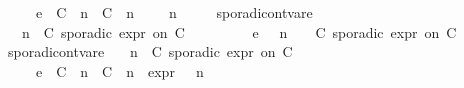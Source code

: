 \begin{isabellebody}
\ \ \ \ \ {\isasymhookrightarrow}\isactrlsub e\ \ {\isacharparenleft}{\isacharparenleft}{\isacharparenleft}C\ {\isasymUp}\ n{\isacharparenright}\ {\isacharhash}\ {\isacharparenleft}C\ {\isasymDown}\ n\ {\isacharat}\ {\isasymtau}{\isacharparenright}\ {\isacharhash}\ {\isasymGamma}{\isacharparenright}{\isacharcomma}\ n\ {\isasymturnstile}\ {\isasymPsi}\ {\isasymtriangleright}\ {\isasymPhi}{\isacharparenright}{\isacartoucheclose}\isanewline
{\isacharbar}\ sporadic{\isacharunderscore}on{\isacharunderscore}tvar{\isacharunderscore}e{}{\isacharcolon}\isanewline
\ \ {\isacartoucheopen}{\isacharparenleft}{\isasymGamma}{\isacharcomma}\ n\ {\isasymturnstile}\ {\isacharparenleft}{\isacharparenleft}C\ sporadic{\isasymsharp}\ {\isasymtau}\isactrlsub e\isactrlsub x\isactrlsub p\isactrlsub r\ on\ C\ {\isacharhash}\ {\isasymPsi}{\isacharparenright}\ {\isasymtriangleright}\ {\isasymPhi}{\isacharparenright}\isanewline
\ \ \ \ \ {\isasymhookrightarrow}\isactrlsub e\ \ {\isacharparenleft}{\isasymGamma}{\isacharcomma}\ n\ {\isasymturnstile}\ {\isasymPsi}\ {\isasymtriangleright}\ {\isacharparenleft}{\isacharparenleft}C\ sporadic{\isasymsharp}\ {\isasymtau}\isactrlsub e\isactrlsub x\isactrlsub p\isactrlsub r\ on\ C\ {\isacharhash}\ {\isasymPhi}{\isacharparenright}{\isacharparenright}{\isacartoucheclose}\isanewline
{\isacharbar}\ sporadic{\isacharunderscore}on{\isacharunderscore}tvar{\isacharunderscore}e{}{\isacharcolon}\isanewline
\ \ {\isacartoucheopen}{\isacharparenleft}{\isasymGamma}{\isacharcomma}\ n\ {\isasymturnstile}\ {\isacharparenleft}{\isacharparenleft}C\ sporadic{\isasymsharp}\ {\isasymtau}\isactrlsub e\isactrlsub x\isactrlsub p\isactrlsub r\ on\ C\ {\isacharhash}\ {\isasymPsi}{\isacharparenright}\ {\isasymtriangleright}\ {\isasymPhi}{\isacharparenright}\isanewline
\ \ \ \ \ {\isasymhookrightarrow}\isactrlsub e\ \ {\isacharparenleft}{\isacharparenleft}{\isacharparenleft}C\ {\isasymUp}\ n{\isacharparenright}\ {\isacharhash}\ {\isacharparenleft}C\ {\isasymDown}\ n\ {\isacharat}{\isasymsharp}\ {\isasymtau}\isactrlsub e\isactrlsub x\isactrlsub p\isactrlsub r{\isacharparenright}\ {\isacharhash}\ {\isasymGamma}{\isacharparenright}{\isacharcomma}\ n\ {\isasymturnstile}\ {\isasymPsi}\ {\isasymtriangleright}\ {\isasymPhi}{\isacharparenright}{\isacartoucheclose}\isanewline

\end{isabellebody}
